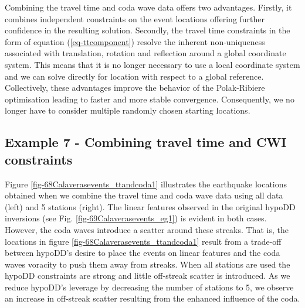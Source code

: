 \documentclass[extra, onecolumn, doublespacing]{gji}
\begin{document}
Combining the travel time and coda wave data offers two advantages.
Firstly, it combines independent constraints on the event locations
offering further confidence in the resulting solution. Secondly, the
travel time constraints in the form of equation
(\ref{eq-ttcomponent}) resolve the inherent non-uniqueness
associated with translation, rotation and reflection around a global
coordinate system. This means that it is no longer necessary to use
a local coordinate system and we can solve directly for location
with respect to a global reference. Collectively, these advantages
improve the behavior of the Polak-Ribiere optimisation leading to
faster and more stable convergence. Consequently, we no longer have
to consider multiple randomly chosen starting locations.


\subsection{Example 7 - Combining travel time and CWI constraints}
 Figure
\ref{fig-68Calaverasevents_ttandcoda1} illustrates the earthquake
locations obtained when we combine the travel time and coda wave
data using all data (left) and 5 stations (right). The linear
features observed in the original hypoDD inversions (see Fig.
\ref{fig-69Calaverasevents_eg1}) is evident in both cases. However,
the coda waves introduce a scatter around these streaks. That is,
the locations in figure \ref{fig-68Calaverasevents_ttandcoda1}
result from a trade-off between hypoDD's desire to place the events
on linear features and the coda waves voracity to push them away
from streaks. When all stations are used the hypoDD constraints are
strong and little off-streak scatter is introduced. As we reduce
hypoDD's leverage by decreasing the number of stations to 5, we
observe an increase in off-streak scatter resulting from the
enhanced influence of the coda.

\end{document}
